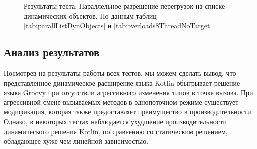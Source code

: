 \begin{figure}
\caption{\label{graph:parallListDynObjectsByArgs}Результаты теста: Параллельное разрешение перегрузок на списке динамических объектов. По данным таблиц \ref{tab:parallListDynObjects} и \ref{tab:overloads8ThreadNoTarget}.}
\end{figure}


\subsection{Анализ результатов}

Посмотрев на результаты работы всех тестов, мы можем сделать вывод, что представленное динамическое расширение языка Kotlin обыгрывает решение языка Groovy при отсутствии агрессивного изменения типов в точке вызова. При агрессивной смене вызываемых методов в однопоточном режиме существует модификация, которая также предоставляет преимущество в производительности. Однако, в некоторых тестах наблюдается ухудшение производительности динамического решения Kotlin, по сравнению со статическим решением, обладающее хуже чем линейной зависимостью. 